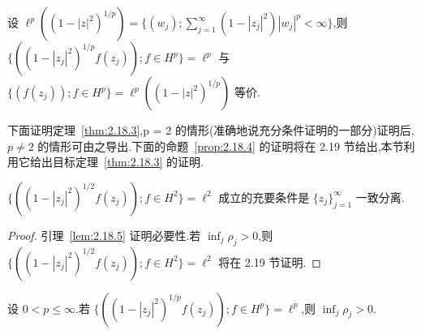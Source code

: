 设 $\ell^{p}((1 - |z|^{2})^{1/p}) = \{(w_{j}); \sum_{j=1}^{\infty}(1 - |z_{j}|^{2})|w_{j}|^{p} < \infty\}$,则 $\{((1 - |z_{j}|^{2})^{1/p}f(z_{j})); f \in H^{p}\} = \ell^{p}$ 与 $\{(f(z_{j})); f \in H^{p}\} = \ell^{p}((1 - |z|^{2})^{1/p})$ 等价.

下面证明定理~\ref{thm:2.18.3},p = 2 的情形(准确地说充分条件证明的一部分)证明后,$p \neq 2$ 的情形可由之导出.下面的命题~\ref{prop:2.18.4} 的证明将在 2.19 节给出,本节利用它给出目标定理~\ref{thm:2.18.3} 的证明.

\begin{proposition}\label{prop:2.18.4}
$\{((1 - |z_{j}|^{2})^{1/2}f(z_{j})); f \in H^{2}\} = \ell^{2}$ 成立的充要条件是 $\{z_{j}\}_{j=1}^{\infty}$ 一致分离.
\end{proposition}

\begin{proof}
引理~\ref{lem:2.18.5} 证明必要性.若 $\inf_{j}\rho_{j} > 0$,则 $\{((1 - |z_{j}|^{2})^{1/2}f(z_{j})); f \in H^{2}\} = \ell^{2}$ 将在 2.19 节证明.
\end{proof}

\begin{lemma}\label{lem:2.18.5}
设 $0 < p \leq \infty$.若 $\{((1 - |z_{j}|^{2})^{1/p}f(z_{j})); f \in H^{p}\} = \ell^{p}$,则 $\inf_{j}\rho_{j} > 0$.
\end{lemma}

